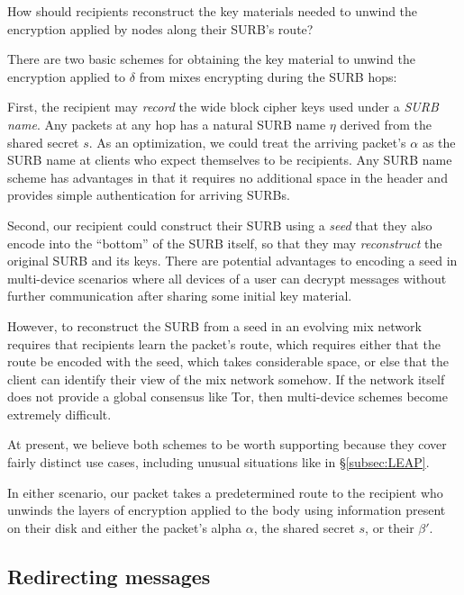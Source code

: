\begin{issue}
How should recipients reconstruct the key materials needed to
unwind the encryption applied by nodes along their SURB's route?
\end{issue}

There are two basic schemes for obtaining the key material to
unwind the encryption applied to $\delta$ from mixes encrypting
during the SURB hops:

First, the recipient may {\em record} the wide block cipher keys used
under a {\it SURB name}.  Any packets at any hop has a natural SURB
name $\eta$ derived from the shared secret $s$.  As an optimization,
we could treat the arriving packet's $\alpha$ as the SURB name at
clients who expect themselves to be recipients.  Any SURB name scheme
has advantages in that it requires no additional space in the header
and provides simple authentication for arriving SURBs.  

Second, our recipient could construct their SURB using a {\em seed}
that they also encode into the ``bottom'' of the SURB itself, so
that they may {\em reconstruct} the original SURB and its keys.
There are potential advantages to encoding a seed in multi-device
scenarios where all devices of a user can decrypt messages without
further communication after sharing some initial key material.

However, to reconstruct the SURB from a seed in an evolving mix
network requires that recipients learn the packet's route, which
requires either that the route be encoded with the seed, which takes
considerable space, or else that the client can identify their view
of the mix network somehow.  If the network itself does not provide
a global consensus like Tor, then multi-device schemes become
extremely difficult.

At present, we believe both schemes to be worth supporting because
they cover fairly distinct use cases, including unusual situations
like in \S\ref{subsec:LEAP}.

In either scenario, our packet takes a predetermined route to the
recipient who unwinds the layers of encryption applied to the body
using information present on their disk and either the packet's alpha
$\alpha$, the shared secret $s$, or their $\beta'$.  


\subsection{Redirecting messages}

